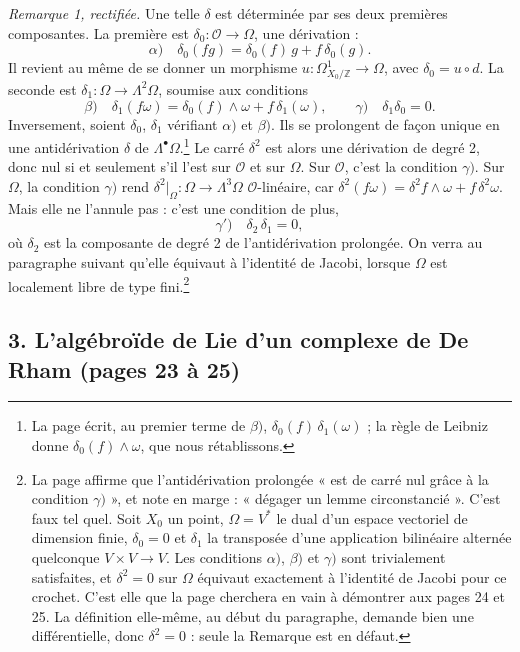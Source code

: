 \documentclass[11pt,a4paper]{article}
\begin{document}
\emph{Remarque 1, rectifiée.} Une telle $\delta$ est déterminée par ses deux
premières composantes. La première est
$\delta_0 : \mathcal{O} \to \Omega$, une dérivation :
\[
\alpha)\quad \delta_0(fg) = \delta_0(f)\,g + f\,\delta_0(g).
\]
Il revient au même de se donner un morphisme $u : \Omega^{1}_{X_0/\mathbb{Z}} \to
\Omega$, avec $\delta_0 = u \circ d$. La seconde est $\delta_1 : \Omega \to
\Lambda^{2}\Omega$, soumise aux conditions
\[
\beta)\quad \delta_1(f\omega) = \delta_0(f) \wedge \omega + f\,\delta_1(\omega),
\qquad
\gamma)\quad \delta_1\delta_0 = 0 .
\]
Inversement, soient $\delta_0$, $\delta_1$ vérifiant $\alpha)$ et $\beta)$.
Ils se prolongent de façon unique en une antidérivation $\delta$ de
$\Lambda^{\bullet}\Omega$.\footnote{La page écrit, au premier terme de
$\beta)$, $\delta_0(f)\,\delta_1(\omega)$ ; la règle de Leibniz donne
$\delta_0(f) \wedge \omega$, que nous rétablissons.} Le carré
$\delta^{2}$ est alors une dérivation de degré 2, donc nul si et seulement s'il
l'est sur $\mathcal{O}$ et sur $\Omega$. Sur $\mathcal{O}$, c'est la condition
$\gamma)$. Sur $\Omega$, la condition $\gamma)$ rend
$\delta^{2}|_{\Omega} : \Omega \to \Lambda^{3}\Omega$ $\mathcal{O}$-linéaire, car
$\delta^{2}(f\omega) = \delta^{2}f \wedge \omega + f\,\delta^{2}\omega$. Mais elle
ne l'annule pas : c'est une condition de plus,
\[
\gamma')\quad \delta_2\,\delta_1 = 0 ,
\]
où $\delta_2$ est la composante de degré 2 de l'antidérivation prolongée. On
verra au paragraphe suivant qu'elle équivaut à l'identité de Jacobi, lorsque
$\Omega$ est localement libre de type fini.\footnote{La page affirme que
l'antidérivation prolongée « est de carré nul grâce à la condition
$\gamma)$ », et note en marge : « dégager un lemme circonstancié ». C'est faux
tel quel. Soit $X_0$ un point, $\Omega = V^{*}$ le dual d'un espace vectoriel
de dimension finie, $\delta_0 = 0$ et $\delta_1$ la transposée d'une
application bilinéaire alternée quelconque $V \times V \to V$. Les conditions
$\alpha)$, $\beta)$ et $\gamma)$ sont trivialement satisfaites, et $\delta^{2} =
0$ sur $\Omega$ équivaut exactement à l'identité de Jacobi pour ce crochet. C'est
elle que la page cherchera en vain à démontrer aux pages 24 et 25. La définition
elle-même, au début du paragraphe, demande bien une différentielle,
donc $\delta^{2} = 0$ : seule la Remarque est en défaut.}

\subsection*{3. L'algébroïde de Lie d'un complexe de De Rham (pages 23 à 25)}
\end{document}
